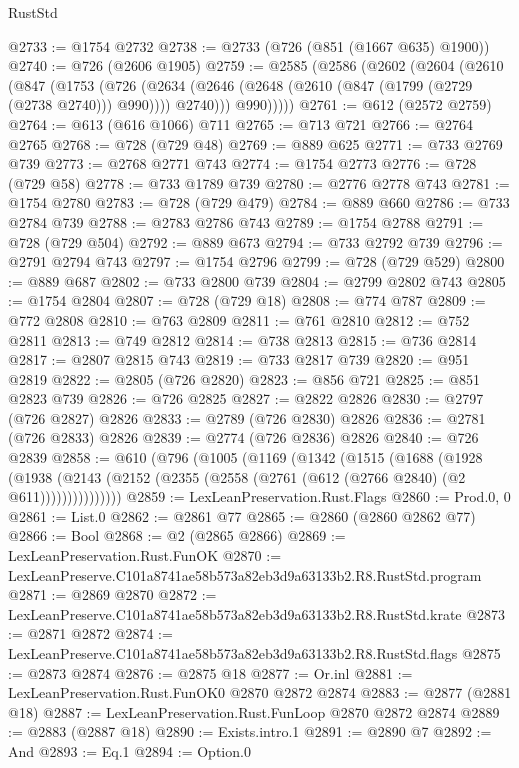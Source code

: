 \begin{lexlean}{RustStd}
\begin{coremodule}
@2733 := @1754 @2732
@2738 := @2733 (@726 (@851 (@1667 @635) @1900))
@2740 := @726 (@2606 @1905)
@2759 := @2585
    (@2586
      (@2602
        (@2604
          (@2610
            (@847
              (@1753
                (@726
                  (@2634 (@2646 (@2648 (@2610 (@847 (@1799 (@2729 (@2738 @2740))) @990)))) @2740)))
              @990)))))
@2761 := @612 (@2572 @2759)
@2764 := @613 (@616 @1066) @711
@2765 := @713 @721
@2766 := @2764 @2765
@2768 := @728 (@729 @48)
@2769 := @889 @625
@2771 := @733 @2769 @739
@2773 := @2768 @2771 @743
@2774 := @1754 @2773
@2776 := @728 (@729 @58)
@2778 := @733 @1789 @739
@2780 := @2776 @2778 @743
@2781 := @1754 @2780
@2783 := @728 (@729 @479)
@2784 := @889 @660
@2786 := @733 @2784 @739
@2788 := @2783 @2786 @743
@2789 := @1754 @2788
@2791 := @728 (@729 @504)
@2792 := @889 @673
@2794 := @733 @2792 @739
@2796 := @2791 @2794 @743
@2797 := @1754 @2796
@2799 := @728 (@729 @529)
@2800 := @889 @687
@2802 := @733 @2800 @739
@2804 := @2799 @2802 @743
@2805 := @1754 @2804
@2807 := @728 (@729 @18)
@2808 := @774 @787
@2809 := @772 @2808
@2810 := @763 @2809
@2811 := @761 @2810
@2812 := @752 @2811
@2813 := @749 @2812
@2814 := @738 @2813
@2815 := @736 @2814
@2817 := @2807 @2815 @743
@2819 := @733 @2817 @739
@2820 := @951 @2819
@2822 := @2805 (@726 @2820)
@2823 := @856 @721
@2825 := @851 @2823 @739
@2826 := @726 @2825
@2827 := @2822 @2826
@2830 := @2797 (@726 @2827) @2826
@2833 := @2789 (@726 @2830) @2826
@2836 := @2781 (@726 @2833) @2826
@2839 := @2774 (@726 @2836) @2826
@2840 := @726 @2839
@2858 := @610
    (@796
      (@1005
        (@1169
          (@1342
            (@1515
              (@1688
                (@1928
                  (@1938
                    (@2143 (@2152 (@2355 (@2558 (@2761 (@612 (@2766 @2840) (@2 @611)))))))))))))))
@2859 := LexLeanPreservation.Rust.Flags
@2860 := Prod.{0, 0}
@2861 := List.{0}
@2862 := @2861 @77
@2865 := @2860 (@2860 @2862 @77)
@2866 := Bool
@2868 := @2 (@2865 @2866)
@2869 := LexLeanPreservation.Rust.FunOK
@2870 := LexLeanPreserve.C101a8741ae58b573a82eb3d9a63133b2.R8.RustStd.program
@2871 := @2869 @2870
@2872 := LexLeanPreserve.C101a8741ae58b573a82eb3d9a63133b2.R8.RustStd.krate
@2873 := @2871 @2872
@2874 := LexLeanPreserve.C101a8741ae58b573a82eb3d9a63133b2.R8.RustStd.flags
@2875 := @2873 @2874
@2876 := @2875 @18
@2877 := Or.inl
@2881 := LexLeanPreservation.Rust.FunOK0 @2870 @2872 @2874
@2883 := @2877 (@2881 @18)
@2887 := LexLeanPreservation.Rust.FunLoop @2870 @2872 @2874
@2889 := @2883 (@2887 @18)
@2890 := Exists.intro.{1}
@2891 := @2890 @7
@2892 := And
@2893 := Eq.{1}
@2894 := Option.{0}

\end{coremodule}
\end{lexlean}
